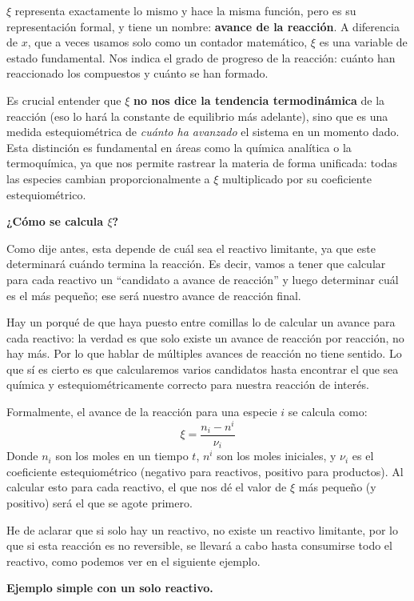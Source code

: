 \(\xi\) representa exactamente lo mismo y hace la misma función,
pero es su representación formal, y tiene un nombre: \textbf{avance
de la reacción}. A diferencia de \(x\), que a veces usamos solo
como un contador matemático, \(\xi\) es una variable de estado
fundamental. Nos indica el grado de progreso de la reacción: 
cuánto han reaccionado los compuestos y cuánto se han formado. 

Es crucial entender que \(\xi\) \textbf{no nos dice la tendencia
termodinámica} de la reacción (eso lo hará la constante de
equilibrio más adelante), sino que es una medida estequiométrica
de \textit{cuánto ha avanzado} el sistema en un momento dado. 
Esta distinción es fundamental en áreas como la química analítica
o la termoquímica, ya que nos permite rastrear la materia de
forma unificada: todas las especies cambian proporcionalmente a
\(\xi\) multiplicado por su coeficiente estequiométrico.

\textbf{¿Cómo se calcula \(\xi\)?}

Como dije antes, esta depende de cuál sea el reactivo limitante,
ya que este determinará cuándo termina la reacción. Es decir,
vamos a tener que calcular para cada reactivo un ``candidato a
avance de reacción'' y luego determinar cuál es el más pequeño;
ese será nuestro avance de reacción final.

Hay un porqué de que haya puesto entre comillas lo de calcular un
avance para cada reactivo: la verdad es que solo existe un avance
de reacción por reacción, no hay más. Por lo que hablar de
múltiples avances de reacción no tiene sentido. Lo que sí es
cierto es que calcularemos varios candidatos hasta encontrar el
que sea química y estequiométricamente correcto para nuestra
reacción de interés.

Formalmente, el avance de la reacción para una especie \(i\) se
calcula como:
\[
\xi = \frac{n_i - n^i}{\nu_i}
\]
Donde \(n_i\) son los moles en un tiempo \(t\), \(n^i\) son los
moles iniciales, y \(\nu_i\) es el coeficiente estequiométrico
(negativo para reactivos, positivo para productos). Al calcular
esto para cada reactivo, el que nos dé el valor de \(\xi\) más
pequeño (y positivo) será el que se agote primero.

He de aclarar que si solo hay un reactivo, no existe un reactivo
limitante, por lo que si esta reacción es no reversible, se
llevará a cabo hasta consumirse todo el reactivo, como podemos
ver en el siguiente ejemplo.

\medskip
\textbf{Ejemplo simple con un solo reactivo.}


